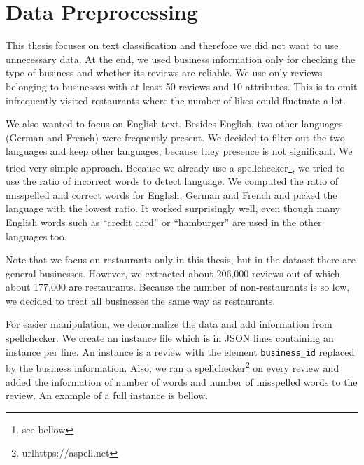 \section{Data Preprocessing}

This thesis focuses on text classification and therefore we did not want to use unnecessary data.
At the end, we used business information only for checking the type of business and whether its reviews are reliable.
We use only reviews belonging to businesses with at least 50 reviews and 10 attributes.
This is to omit infrequently visited restaurants where the number of likes could fluctuate a lot.

We also wanted to focus on English text.
Besides English, two other languages (German and French) were frequently present.
We decided to filter out the two languages and keep other languages, because they presence is not significant.
We tried very simple approach.
Because we already use a spellchecker\footnote{see bellow}, we tried to use the ratio of incorrect words to detect language.
We computed the ratio of misspelled and correct words for English, German and French and picked the language with the lowest ratio.
It worked surprisingly well, even though many English words such as ``credit card'' or ``hamburger'' are used in the other languages too.

Note that we focus on restaurants only in this thesis, but in the dataset there are general businesses.
However, we extracted about 206,000 reviews out of which about 177,000 are restaurants.
Because the number of non-restaurants is so low, we decided to treat all businesses the same way as restaurants.

For easier manipulation, we denormalize the data and add information from spellchecker.
We create an instance file which is in JSON lines containing an instance per line.
An instance is a review with the element \texttt{business\_id} replaced by the business information.
Also, we ran a spellchecker\footnote{url{https://aspell.net}} on every review and added the information of number of words and number of misspelled words to the review.
An example of a full instance is bellow.

